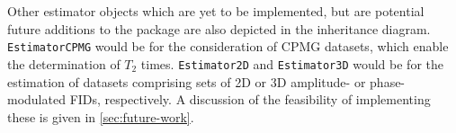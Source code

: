 Other estimator objects which are yet to be implemented, but are potential
future additions to the package are also depicted in the inheritance diagram.
\texttt{EstimatorCPMG} would be for the consideration of \ac{CPMG} datasets,
which enable the determination of $T_2$ times.
\texttt{Estimator2D} and \texttt{Estimator3D} would be
for the estimation of datasets comprising sets of \ac{2D} or \ac{3D} amplitude-
or phase-modulated \acp{FID}, respectively. A discussion of the feasibility of
implementing these is given in \cref{sec:future-work}.
